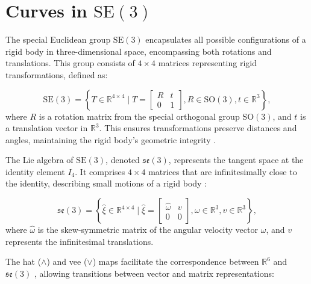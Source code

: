 \section{Curves in \texorpdfstring{\(\mathrm{SE}(3)\)}{SE(3)}}
\label{sec:curves-in-SE3}

The special Euclidean group \(\mathrm{SE}(3)\) encapsulates all possible configurations of a rigid body in three-dimensional space, encompassing both rotations and translations. This group consists of \(4 \times 4\) matrices representing rigid transformations, defined as:

\begin{equation}
    \mathrm{SE}(3) = \left\{ T \in \mathbb{R}^{4 \times 4} \mid T = \begin{bmatrix} R & t \\ 0 & 1 \end{bmatrix}, R \in \mathrm{SO}(3), t \in \mathbb{R}^3 \right\},
    \label{eq:SE3}
\end{equation}
where \(R\) is a rotation matrix from the special orthogonal group \(\mathrm{SO}(3)\), and \(t\) is a translation vector in \(\mathbb{R}^3\). This ensures transformations preserve distances and angles, maintaining the rigid body's geometric integrity \cite{wangNonparametricSecondOrderTheory2008, blanco-claracoTutorialMathbfSE2022}.

The Lie algebra of \(\mathrm{SE}(3)\), denoted \(\mathfrak{se}(3)\), represents the tangent space at the identity element \(I_4\). It comprises \(4 \times 4\) matrices that are infinitesimally close to the identity, describing small motions of a rigid body \cite{wangNonparametricSecondOrderTheory2008, blanco-claracoTutorialMathbfSE2022}:

\begin{equation}
    \mathfrak{se}(3) = \left\{ \hat{\xi} \in \mathbb{R}^{4 \times 4} \mid \hat{\xi} = \begin{bmatrix} \hat{\omega} & v \\ 0 & 0 \end{bmatrix}, \omega \in \mathbb{R}^3, v \in \mathbb{R}^3 \right\},
\end{equation}
where \(\hat{\omega}\) is the skew-symmetric matrix of the angular velocity vector \(\omega\), and \(v\) represents the infinitesimal translations.

The hat (\(\wedge\)) and vee (\(\vee\)) maps facilitate the correspondence between \(\mathbb{R}^6\) and \(\mathfrak{se}(3)\) \cite{wangNonparametricSecondOrderTheory2008, blanco-claracoTutorialMathbfSE2022}, allowing transitions between vector and matrix representations:

